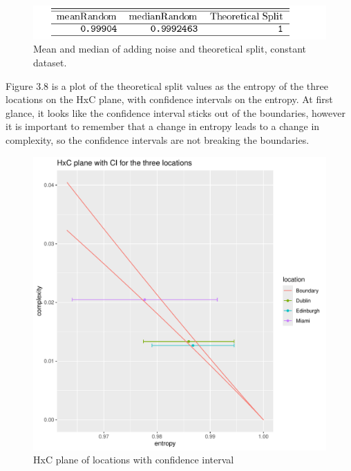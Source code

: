 \begin{figure}
    \centering
    \includegraphics[width=\textwidth,keepaspectratio]{Weather/random_vs_theoreticalSplitWhiteNoise.pdf}
    \caption{Mean and median of adding noise and theoretical split, constant dataset.}
\end{figure}

Figure 3.8 is a plot of the theoretical split values as the entropy of the three locations on the HxC plane, with confidence intervals on the entropy. At first glance, it looks like the confidence interval sticks out of the boundaries, however it is important to remember that a change in entropy leads to a change in complexity, so the confidence intervals are not breaking the boundaries. 

\begin{figure}
    \centering
    \includegraphics[width=\textwidth,keepaspectratio]{Weather/confidenceIntervalPlot.pdf}
    \caption{HxC plane of locations with confidence interval}
\end{figure}

